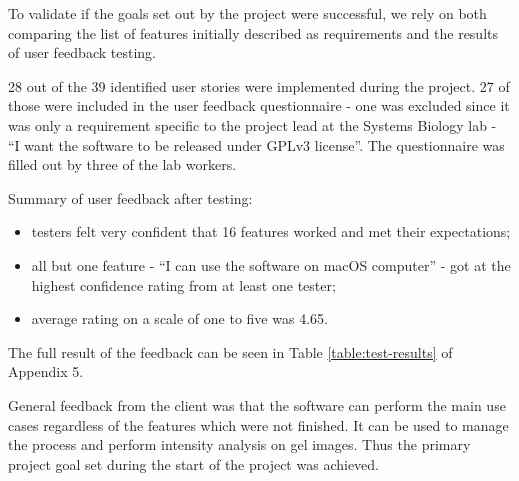 To validate if the goals set out by the project were successful, we rely on both comparing the list of features initially described as requirements and the results of user feedback testing.

28 out of the 39 identified user stories were implemented during the project. 27 of those were included in the user feedback questionnaire - one was excluded since it was only a requirement specific to the project lead at the Systems Biology lab - “I want the software to be released under GPLv3 license”. The questionnaire was filled out by three of the lab workers.

Summary of user feedback after testing:
\begin{itemize}
    \item testers felt very confident that 16 features worked and met their expectations;
    \item all but one feature - “I can use the software on macOS computer” - got at the highest confidence rating from at least one tester;
    \item average rating on a scale of one to five was 4.65.
\end{itemize}

The full result of the feedback can be seen in Table \ref{table:test-results} of Appendix 5.

General feedback from the client was that the software can perform the main use cases regardless of the features which were not finished. It can be used to manage the process and perform intensity analysis on gel images. Thus the primary project goal set during the start of the project was achieved.
